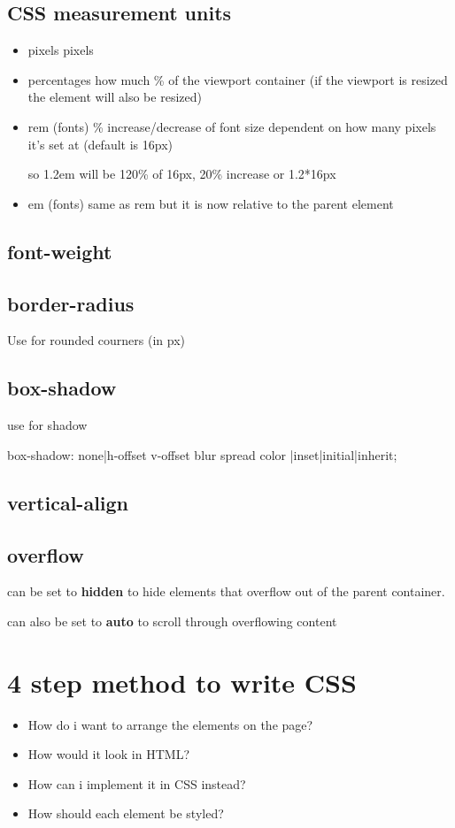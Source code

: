 \documentclass[11pt]{article}
\begin{document}
\subsection{CSS measurement units}
\label{sec:org9ba28b8}
\begin{itemize}
\item pixels
pixels
\item percentages
how much \% of the viewport container (if the viewport is resized the element will also be resized)
\item rem (fonts)
\% increase/decrease of font size dependent on how many pixels it's set at (default is 16px)

so 1.2em will be 120\% of 16px, 20\% increase or 1.2*16px
\item em (fonts)
same as rem but it is now relative to the parent element
\end{itemize}
\subsection{font-weight}
\label{sec:org88e30bc}
\subsection{border-radius}
\label{sec:org066db6a}
Use for rounded courners (in px)
\subsection{box-shadow}
\label{sec:org54d9c15}
use for shadow

box-shadow: none|h-offset v-offset blur spread color |inset|initial|inherit;
\subsection{vertical-align}
\label{sec:orgc1cdc4f}
\subsection{overflow}
\label{sec:org99122e6}
can be set to \textbf{hidden} to hide elements that overflow out of the parent container.

can also be set to \textbf{auto} to scroll through overflowing content
\section{4 step method to write CSS}
\label{sec:org42be59b}
\begin{itemize}
\item How do i want to arrange the elements on the page?
\item How would it look in HTML?
\item How can i implement it in CSS instead?
\item How should each element be styled?
\end{itemize}
\end{document}
